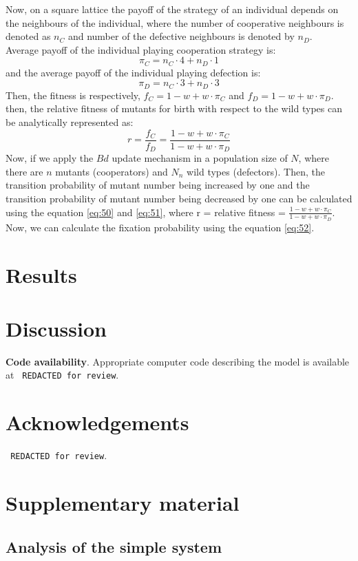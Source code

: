 \documentclass{article}
\begin{document}
Now, on a square lattice the payoff of the strategy of an individual depends on the neighbours of the individual, where the number of cooperative neighbours is denoted as $n_C$ and number of the defective neighbours is denoted by $n_D$. \\
Average payoff of the individual playing cooperation strategy is:
\begin{equation}
\pi_C = n_C \cdot 4 + n_D \cdot 1 \label{eq:56}
\end{equation}
and the average payoff of the individual playing defection is:
\begin{equation}
\pi_D = n_C \cdot 3 + n_D \cdot 3 \label{eq:57}
\end{equation}
Then, the fitness is respectively, $f_C = 1 - w + w \cdot \pi_C$ and $f_D = 1 - w + w \cdot \pi_D$.
then, the relative fitness of mutants for birth with respect to the wild types can be analytically represented as:
\begin{equation}
r = \frac{f_C}{f_D} = \frac{1 - w + w \cdot \pi_C}{1 - w + w \cdot \pi_D} \label{eq:58}
\end{equation}
Now, if we apply the $Bd$ update mechanism in a population size of $N$, where there are $n$ mutants (cooperators) and $N_n$ wild types (defectors). Then, the transition probability of mutant number being increased by one and the transition probability of mutant number being decreased by one can be calculated using the equation \eqref{eq:50} and \eqref{eq:51}, where r = relative fitness = $\frac{1 - w + w \cdot \pi_C}{1 - w + w \cdot \pi_D}$. Now, we can calculate the fixation probability using the equation \eqref{eq:52}.







\section{Results}
\section{Discussion}





\textbf{Code availability}.
Appropriate computer code describing the model is available at 
\texttt{ REDACTED for review}.%

\section{Acknowledgements}
\texttt{ REDACTED for review}.%





\renewcommand{\theequation}{SI.\arabic{equation}}
\setcounter{equation}{0}

\renewcommand{\thefigure}{SI.\arabic{figure}}
\setcounter{figure}{0}

\section{Supplementary material}


\subsection{Analysis of the simple system}
\end{document}
